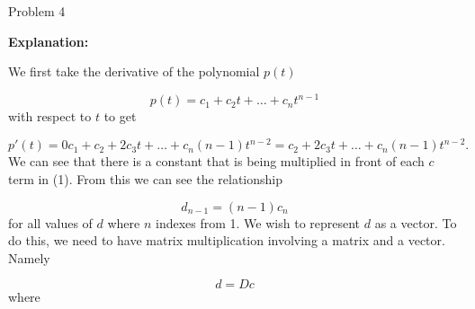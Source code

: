 \begin{problem}{Problem 4}
\begin{highlight}[Solution]
        \noindent \textbf{Explanation:} \vspace*{1em}

        We first take the derivative of the polynomial $p(t)$ 
        
        \begin{equation*}
            p(t) = c_{1} + c_{2}t + \dots + c_{n}t^{n-1}
        \end{equation*}
        with respect to $t$ to get

        \setcounter{equation}{0}
        \begin{equation}
            p'(t) = 0c_{1} + c_{2} + 2c_{3}t + \dots + c_{n}(n-1)t^{n-2} = c_{2} + 2c_{3}t + \dots + c_{n}(n-1)t^{n-2}.
        \end{equation}
        We can see that there is a constant that is being multiplied in front of each $c$ term in (1). From this we can see the relationship 

        \begin{equation}
            d_{n - 1} = (n - 1)c_{n}
        \end{equation}
        for all values of $d$ where $n$ indexes from 1. We wish to represent $d$ as a vector. To do this, we need to have matrix multiplication involving a matrix and a vector. Namely

        \begin{equation}
            d = Dc
        \end{equation}
        where


\end{highlight}
\end{problem}
